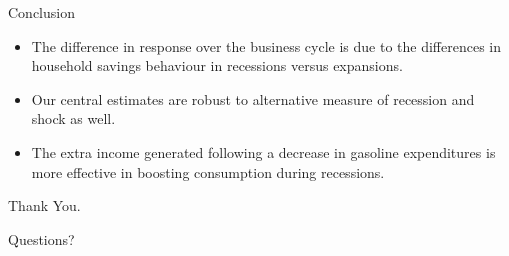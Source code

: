 \documentclass[
  10pt,
  ignorenonframetext,
]{beamer}
\begin{document}
\begin{frame}{Conclusion}
\protect\hypertarget{conclusion-1}{}

\begin{itemize}
\item
  The difference in response over the business cycle is due to the
  differences in household savings behaviour in recessions versus
  expansions.
\item
  Our central estimates are robust to alternative measure of recession
  and shock as well.
\item
  The extra income generated following a decrease in gasoline
  expenditures is more effective in boosting consumption during
  recessions.
\end{itemize}

\end{frame}

\begin{frame}{Thank You.}
\protect\hypertarget{thank-you.}{}

\begin{center}
Questions?
\end{center}

\end{frame}
\end{document}
